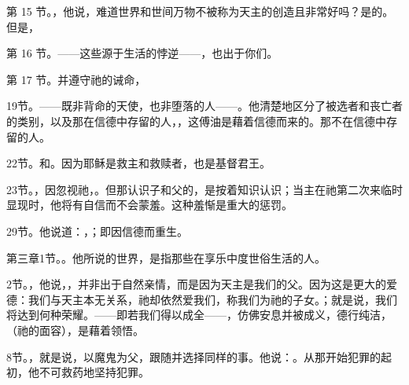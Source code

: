 第 15 节。，他说，难道世界和世间万物不被称为天主的创造且非常好吗？是的。但是，\par

第 16 节。——这些源于生活的悖逆——，也出于你们。\par

第 17 节。并遵守祂的诫命，\par

 19节。——既非背命的天使，也非堕落的人——。他清楚地区分了被选者和丧亡者的类别，以及那在信德中存留的人，，这傅油是藉着信德而来的。那不在信德中存留的人。\par

 22节。和。因为耶稣是救主和救赎者，也是基督君王。\par

 23节。，因忽视祂，。但那认识子和父的，是按着知识认识；当主在祂第二次来临时显现时，他将有自信而不会蒙羞。这种羞惭是重大的惩罚。\par

 29节。他说道：，；即因信德而重生。\par

 第三章1节。。他所说的世界，是指那些在享乐中度世俗生活的人。\par

 2节。，他说，，并非出于自然亲情，而是因为天主是我们的父。因为这是更大的爱德：我们与天主本无关系，祂却依然爱我们，称我们为祂的子女。；就是说，我们将达到何种荣耀。——即若我们得以成全——，仿佛安息并被成义，德行纯洁，（祂的面容），是藉着领悟。\par

 8节。，就是说，以魔鬼为父，跟随并选择同样的事。他说：。从那开始犯罪的起初，他不可救药地坚持犯罪。\par

